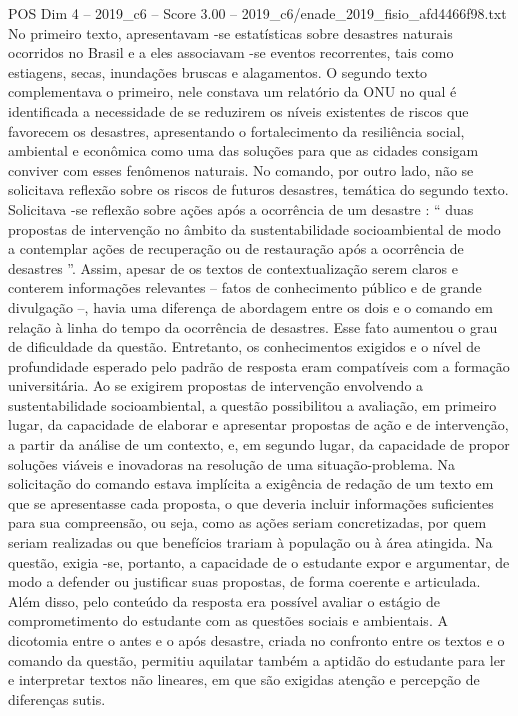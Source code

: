 \begin{textsample}{POS Dim 4 – 2019\_c6 – Score 3.00 – 2019\_c6/enade\_2019\_fisio\_afd4466f98.txt}
No primeiro texto, apresentavam -se estatísticas sobre desastres naturais ocorridos no Brasil e a eles associavam -se eventos recorrentes, tais como estiagens, secas, inundações bruscas e alagamentos.
O segundo texto complementava o primeiro, nele constava um relatório da ONU no qual é identificada a necessidade de se reduzirem os níveis existentes de riscos que favorecem os desastres, apresentando o fortalecimento da resiliência social, ambiental e econômica como uma das soluções para que as cidades consigam conviver com esses fenômenos naturais.
No comando, por outro lado, não se solicitava reflexão sobre os riscos de futuros desastres, temática do segundo texto.
Solicitava -se reflexão sobre ações após a ocorrência de um desastre : “ duas propostas de intervenção no âmbito da sustentabilidade socioambiental de modo a contemplar ações de recuperação ou de restauração após a ocorrência de desastres ”.
Assim, apesar de os textos de contextualização serem claros e conterem informações relevantes – fatos de conhecimento público e de grande divulgação –, havia uma diferença de abordagem entre os dois e o comando em relação à linha do tempo da ocorrência de desastres.
Esse fato aumentou o grau de dificuldade da questão.
Entretanto, os conhecimentos exigidos e o nível de profundidade esperado pelo padrão de resposta eram compatíveis com a formação universitária.
Ao se exigirem propostas de intervenção envolvendo a sustentabilidade socioambiental, a questão possibilitou a avaliação, em primeiro lugar, da capacidade de elaborar e apresentar propostas de ação e de intervenção, a partir da análise de um contexto, e, em segundo lugar, da capacidade de propor soluções viáveis e inovadoras na resolução de uma situação-problema.
Na solicitação do comando estava implícita a exigência de redação de um texto em que se apresentasse cada proposta, o que deveria incluir informações suficientes para sua compreensão, ou seja, como as ações seriam concretizadas, por quem seriam realizadas ou que benefícios trariam à população ou à área atingida.
Na questão, exigia -se, portanto, a capacidade de o estudante expor e argumentar, de modo a defender ou justificar suas propostas, de forma coerente e articulada.
Além disso, pelo conteúdo da resposta era possível avaliar o estágio de comprometimento do estudante com as questões sociais e ambientais.
A dicotomia entre o antes e o após desastre, criada no confronto entre os textos e o comando da questão, permitiu aquilatar também a aptidão do estudante para ler e interpretar textos não lineares, em que são exigidas atenção e percepção de diferenças sutis.

\end{textsample}
